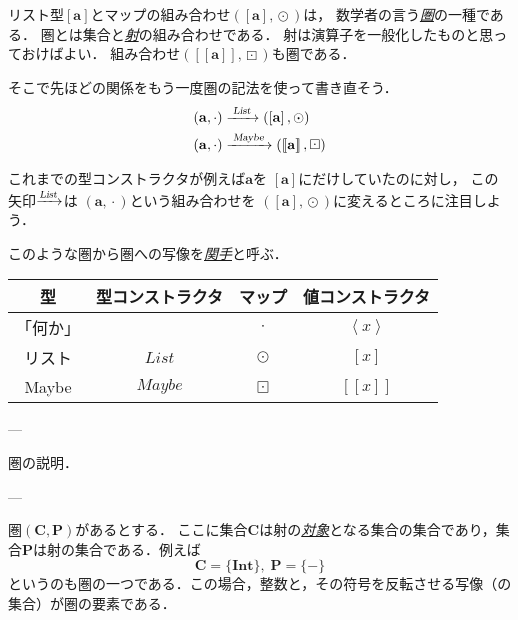 \documentclass[a5paper,draft]{jsbook}
\def\[{\left[\!\left[}
\def\]{\right]\!\right]}
\newcommand{\keyword}[1]{{\underline{\emph{#1}}}}
\newcommand{\mathSet}[1]{\mathbf{#1}} %
\newcommand{\mathTypeParameter}[1]{\mathbf{#1}}
\newcommand{\mathTypeName}[1]{\mathbf{#1}}
\newcommand{\mathFunctor}[1]{\mathop{\textsl{#1}}} %
\newcommand{\mathTypeConstructor}[1]{\mathit{#1}} %
\newcommand{\mathListWith}[1]{\left[#1\right]}
\newcommand{\mathTupleWith}[1]{\left(#1\right)}
\newcommand{\mathMaybeWith}[1]{\[#1\]}
\newcommand{\mathPureWith}[1]{\left\langle#1\right\rangle}
\newcommand{\mathListType}[1]{\left[#1\right]}
\newcommand{\mathMaybeType}[1]{\[#1\]}
\DeclareMathOperator{\mathList}{\mathTypeConstructor{List}}
\DeclareMathOperator{\mathMaybe}{\mathTypeConstructor{Maybe}}
\newcommand{\mathBinaryOperator}[1]{\operatorname{#1}}
\newcommand{\mathGeneralMap}{\mathBinaryOperator{\cdot}}
\newcommand{\mathMap}{\mathBinaryOperator{\odot}}
\newcommand{\mathMaybeMap}{\mathBinaryOperator{\boxdot}}
\newcommand{\mathCategoryShort}[2]{(#1,#2)}
\begin{document}
リスト型$\mathListType{\mathTypeParameter{a}}$とマップの組み合わせ$\mathTupleWith{\mathListType{\mathTypeParameter{a}},\mathMap}$は，
数学者の言う\keyword{圏}の一種である．
圏とは集合と\keyword{射}の組み合わせである．
射は演算子を一般化したものと思っておけばよい．
組み合わせ$\mathTupleWith{\mathMaybeType{\mathTypeParameter{a}},\mathMaybeMap}$も圏である．

そこで先ほどの関係をもう一度圏の記法を使って書き直そう．
\begin{align}
\mathTupleWith{\mathTypeParameter{a},\mathGeneralMap}
&\xrightarrow{\;\mathFunctor{List}\;}\mathTupleWith{\mathListType{\mathTypeParameter{a}},\mathMap}\\
\mathTupleWith{\mathTypeParameter{a},\mathGeneralMap}
&\xrightarrow{\;\mathFunctor{Maybe}\;}\mathTupleWith{\mathMaybeType{\mathTypeParameter{a}},\mathMaybeMap}
\end{align}

これまでの型コンストラクタが例えば$\mathTypeParameter{a}$を
$\mathListType{\mathTypeParameter{a}}$にだけしていたのに対し，
この矢印$\xrightarrow{\mathFunctor{List}}$は
$\mathTupleWith{\mathTypeParameter{a},\mathGeneralMap}$という組み合わせを
$\mathTupleWith{\mathListType{\mathTypeParameter{a}},\mathMap}$に変えるところに注目しよう．

このような圏から圏への写像を\keyword{関手}と呼ぶ．

\begin{table}
\begin{center}
\begin{tabular}{||c|c|c|c||}\hline
型&型コンストラクタ&マップ&値コンストラクタ\\\hline\hline
「何か」&&$\mathGeneralMap$&$\mathPureWith{x}$\\
リスト&$\mathList$&$\mathMap$&$\mathListWith{x}$\\
Maybe&$\mathMaybe$&$\mathMaybeMap$&$\mathMaybeWith{x}$\\\hline
\end{tabular}
\end{center}
\end{table}


---

圏の説明．

---

圏$\mathCategoryShort{\mathSet{C}}{\mathSet{P}}$があるとする．
ここに集合$\mathSet{C}$は射の\keyword{対象}となる集合の集合であり，集合$\mathSet{P}$は射の集合である．例えば$$\mathSet{C}=\{\mathTypeName{Int}\},\;\mathSet{P}=\{-\}$$というのも圏の一つである．この場合，整数と，その符号を反転させる写像（の集合）が圏の要素である．
\end{document}

